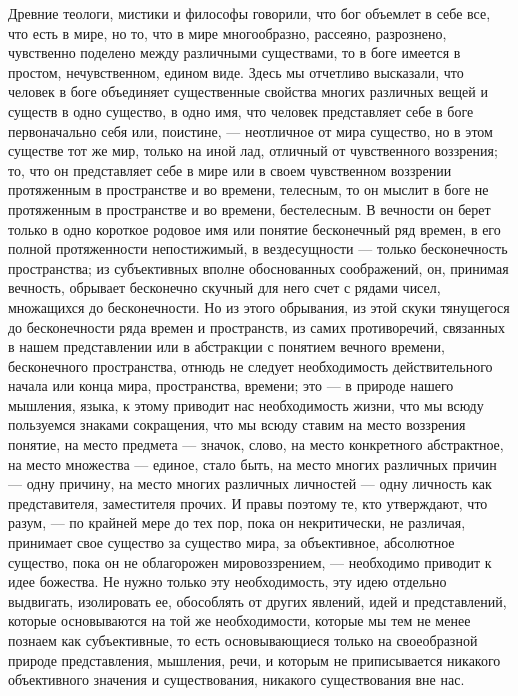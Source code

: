 \documentclass[12pt]{article}
\begin{document}
Древние теологи, мистики и философы говорили, что бог объемлет в себе все, что есть в мире, но то, что в мире многообразно, рассеяно, разрознено, чувственно поделено между различными существами, то в боге имеется в простом, нечувственном, едином виде. Здесь мы отчетливо высказали, что человек в боге объединяет существенные свойства многих различных вещей и существ в одно существо, в одно имя, что человек представляет себе в боге первоначально себя или, поистине, --- неотличное от мира существо, но в этом существе тот же мир, только на иной лад, отличный от чувственного воззрения; то, что он представляет себе в мире или в своем чувственном воззрении протяженным в пространстве и во времени, телесным, то он мыслит в боге не протяженным в пространстве и во времени, бестелесным. В вечности он берет только в одно короткое родовое имя или понятие бесконечный ряд времен, в его полной протяженности непостижимый, в вездесущности --- только бесконечность пространства; из субъективных вполне обоснованных соображений, он, принимая вечность, обрывает бесконечно скучный для него счет с рядами чисел, множащихся до бесконечности. Но из этого обрывания, из этой скуки тянущегося до бесконечности ряда времен и пространств, из самих противоречий, связанных в нашем представлении или в абстракции с понятием вечного времени, бесконечного пространства, отнюдь не следует необходимость действительного начала или конца мира, пространства, времени; это --- в природе нашего мышления, языка, к этому приводит нас необходимость жизни, что мы всюду пользуемся знаками сокращения, что мы всюду ставим на место воззрения понятие, на место предмета --- значок, слово, на место конкретного абстрактное, на место множества --- единое, стало быть, на место многих различных причин --- одну причину, на место многих различных личностей --- одну личность как представителя, заместителя прочих. И правы поэтому те, кто утверждают, что разум, --- по крайней мере до тех пор, пока он некритически, не различая, принимает свое существо за существо мира, за объективное, абсолютное существо, пока он не облагорожен мировоззрением, --- необходимо приводит к идее божества. Не нужно только эту необходимость, эту идею отдельно выдвигать, изолировать ее, обособлять от других явлений, идей и представлений, которые основываются на той же необходимости, которые мы тем не менее познаем как субъективные, то есть основывающиеся только на своеобразной природе представления, мышления, речи, и которым не приписывается никакого объективного значения и существования, никакого существования вне нас. 
\end{document}
